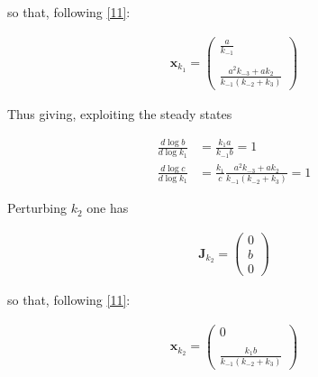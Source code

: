 \documentclass{article}
\begin{document}
	so that, following \eqref{11}:
	
	\begin{center}
		\begin{equation}
			\begin{aligned}
				\mathbf{x}_{k_1}= \begin{pmatrix}
					\frac{a}{k_{-1}} \\ \\
					\frac{a^2 k_{-3} +a k_2}{k_{-1}(k_{-2}+k_3)}
				\end{pmatrix}
				\label{94}
			\end{aligned}
		\end{equation}
	\end{center}
	
	
	Thus giving, exploiting the steady states
	
	\begin{center}
		\begin{equation}
			\begin{aligned}
				\frac{d \log b}{d \log k_1} &= \frac{k_1 a}{k_{-1} b} =1 \\
				\frac{d \log c}{d \log k_1} &= \frac{k_1}{c} \frac{a^2 k_{-3} +a k_2}{k_{-1}(k_{-2}+k_3)} = 1
			\end{aligned}
		\end{equation}
	\end{center}
	
	Perturbing $k_2$ one has
	
	\begin{center}
		\begin{equation}
			\begin{aligned}
				\mathbf{J}_{k_2}= \begin{pmatrix}
					0\\
					b\\
					0
				\end{pmatrix}
				\label{95}
			\end{aligned}
		\end{equation}
	\end{center}
	
	so that, following \eqref{11}:
	
	\begin{center}
		\begin{equation}
			\begin{aligned}
				\mathbf{x}_{k_2}= \begin{pmatrix}
					0 \\ \\
					\frac{k_1 b}{k_{-1}(k_{-2}+k_3)}
				\end{pmatrix}
				\label{96}
			\end{aligned}
		\end{equation}
	\end{center}
	
\end{document}
